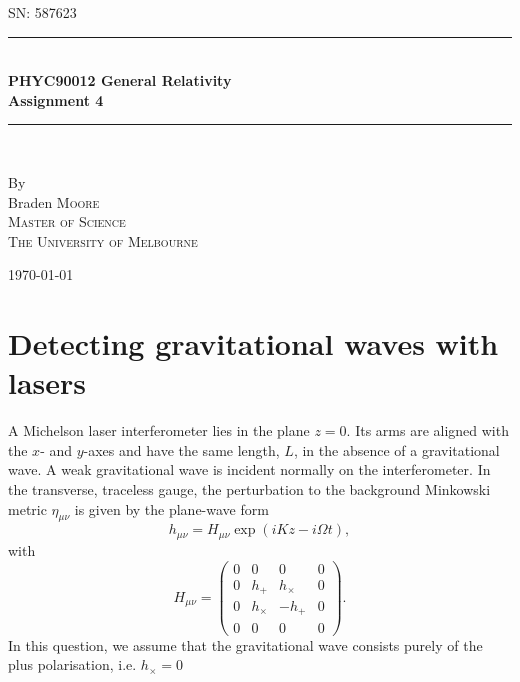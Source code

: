 \documentclass[a4paper]{article} %
\newcommand{\pmx}[1]{\begin{pmatrix}#1\end{pmatrix}}
\begin{document}
\pagestyle{empty}

\newcommand{\HRule}{\rule{\linewidth}{0.5mm}}

\begin{titlepage}

    \begin{center}
        \textsc{\large SN: 587623}\\[6cm]

        \HRule \\[0.5cm]
		\Huge \textbf{PHYC90012 General Relativity}\\[0.5cm]
        \huge \textbf{Assignment 4}\\[0.5cm] 
        \HRule \\[1.5cm]
        \begin{minipage}{0.4\textwidth}
        \begin{center}

        \large By \\[0.75cm]
        \huge Braden \scshape Moore \\[0.5cm]
        \normalsize \normalfont Master of Science \\
        The University of Melbourne \\

        \end{center}
        \end{minipage}

        \vfill

        \large \today
    \end{center}

\newpage
\end{titlepage}
\pagestyle{fancy}
\lfoot{\textsc{\today}}
\setcounter{page}{1}
\setcounter{section}{3}
\section{Detecting gravitational waves with lasers}

\begin{framed}
A Michelson laser interferometer lies in the plane $z = 0$. Its arms are aligned with the $x$- and $y$-axes and have the same
length, $L$, in the absence of a gravitational wave. A weak gravitational wave is incident normally on the interferometer. In the transverse, traceless gauge, the perturbation to the background Minkowski metric $\eta_{\mu\nu}$ is given by the plane-wave form
\begin{equation}
h_{\mu\nu}=H_{\mu\nu}\exp(iKz-i \Omega t),
\end{equation}
with
\begin{equation}
H_{\mu\nu}=\pmx{0&0&0&0\\0&h_+&h_{\times}&0\\0&h_{\times}&-h_{+}&0\\0&0&0&0}.
\end{equation}
In this question, we assume that the gravitational wave consists purely of the plus polarisation, i.e. $h_{\times}=0$
\end{framed}
\end{document}
